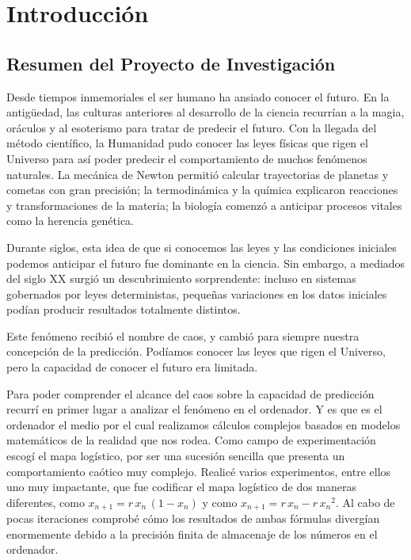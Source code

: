 \documentclass[
  11pt,
  a4paper,
  DIV=11,
  numbers=noendperiod]{scrreprt}
\begin{document}
\part{Introducción}

\chapter{Resumen del Proyecto de
Investigación}\label{resumen-del-proyecto-de-investigaciuxf3n}

Desde tiempos inmemoriales el ser humano ha ansiado conocer el futuro.
En la antigüedad, las culturas anteriores al desarrollo de la ciencia
recurrían a la magia, oráculos y al esoterismo para tratar de predecir
el futuro. Con la llegada del método científico, la Humanidad pudo
conocer las leyes físicas que rigen el Universo para así poder predecir
el comportamiento de muchos fenómenos naturales. La mecánica de Newton
permitió calcular trayectorias de planetas y cometas con gran precisión;
la termodinámica y la química explicaron reacciones y transformaciones
de la materia; la biología comenzó a anticipar procesos vitales como la
herencia genética.

Durante siglos, esta idea de que si conocemos las leyes y las
condiciones iniciales podemos anticipar el futuro fue dominante en la
ciencia. Sin embargo, a mediados del siglo XX surgió un descubrimiento
sorprendente: incluso en sistemas gobernados por leyes deterministas,
pequeñas variaciones en los datos iniciales podían producir resultados
totalmente distintos.

Este fenómeno recibió el nombre de caos, y cambió para siempre nuestra
concepción de la predicción. Podíamos conocer las leyes que rigen el
Universo, pero la capacidad de conocer el futuro era limitada.

Para poder comprender el alcance del caos sobre la capacidad de
predicción recurrí en primer lugar a analizar el fenómeno en el
ordenador. Y es que es el ordenador el medio por el cual realizamos
cálculos complejos basados en modelos matemáticos de la realidad que nos
rodea. Como campo de experimentación escogí el mapa logístico, por ser
una sucesión sencilla que presenta un comportamiento caótico muy
complejo. Realicé varios experimentos, entre ellos uno muy impactante,
que fue codificar el mapa logístico de dos maneras diferentes, como
\(x_{n+1} = r\,x_n\,(1 - x_n)\) y como
\(x_{n+1} = r\,x_n - r\,{x_n}^2\). Al cabo de pocas iteraciones comprobé
cómo los resultados de ambas fórmulas divergían enormemente debido a la
precisión finita de almacenaje de los números en el ordenador.
\end{document}

